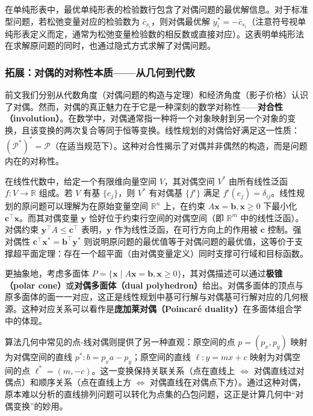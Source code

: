 \documentclass[12pt]{article}
\theoremstyle{plain}
\theoremstyle{definition}
\begin{document}
在单纯形表中，最优单纯形表的检验数行包含了对偶问题的最优解信息。对于标准型问题，若松弛变量对应的检验数为 $\bar{c}_{s_i}$，则对偶最优解 $y_i^* = -\bar{c}_{s_i}$（注意符号视单纯形表定义而定，通常为松弛变量检验数的相反数或直接对应）。这表明单纯形法在求解原问题的同时，也通过隐式方式求解了对偶问题。

\subsubsection{拓展：对偶的对称性本质——从几何到代数}\label{subsubsec:duality_symmetry}

前文我们分别从代数角度（对偶问题的构造与定理）和经济角度（影子价格）认识了对偶。然而，对偶的真正魅力在于它是一种深刻的数学对称性——\textbf{对合性（involution）}。在数学中，对偶通常指一种将一个对象映射到另一个对象的变换，且该变换的两次复合等同于恒等变换。线性规划的对偶恰好满足这一性质：$(\mathcal{P}^*)^* = \mathcal{P}$（在适当规范下）。这种对合性揭示了对偶并非偶然的构造，而是问题内在的对称性。

在线性代数中，给定一个有限维向量空间 $V$，其对偶空间 $V^*$ 由所有线性泛函 $f: V \to \mathbb{R}$ 组成。若 $V$ 有基 $\{e_j\}$，则 $V^*$ 有对偶基 $\{f^i\}$ 满足 $f^i(e_j)=\delta_{ij}$。线性规划的原问题可以理解为在原始变量空间 $\mathbb{R}^n$ 上，在约束 $A\bm{x}=\bm{b}, \bm{x}\ge 0$ 下最小化 $\bm{c}^\top \bm{x}$。而其对偶变量 $\bm{y}$ 恰好位于约束行空间的对偶空间（即 $\mathbb{R}^m$ 中的线性泛函）。对偶约束 $\bm{y}^\top A \le \bm{c}^\top$ 表明，$\bm{y}$ 作为线性泛函，在可行方向上的作用被 $\bm{c}$ 控制。强对偶性 $\bm{c}^\top \bm{x}^* = \bm{b}^\top \bm{y}^*$ 则说明原问题的最优值等于对偶问题的最优值，这等价于支撑超平面定理：存在一个超平面（由对偶变量定义）同时支撑可行域和目标函数。

更抽象地，考虑多面体 $P = \{\bm{x} \mid A\bm{x} = \bm{b}, \bm{x} \ge 0\}$，其对偶描述可以通过\textbf{极锥（polar cone）}或\textbf{对偶多面体（dual polyhedron）}给出。对偶多面体的顶点与原多面体的面一一对应，这正是线性规划中基可行解与对偶基可行解对应的几何根源。这种对应关系可以看作是\textbf{庞加莱对偶（Poincaré duality）}在多面体组合学中的体现。

算法几何中常见的点-线对偶则提供了另一种直观：原空间的点 $p=(p_x, p_y)$ 映射为对偶空间的直线 $p^*: b = p_x a - p_y$；原空间的直线 $\ell: y = mx + c$ 映射为对偶空间的点 $\ell^* = (m, -c)$。这一变换保持关联关系（点在直线上 $\iff$ 对偶直线过对偶点）和顺序关系（点在直线上方 $\iff$ 对偶直线在对偶点下方）。通过这种对偶，原本难以分析的直线排列问题可以转化为点集的凸包问题，这正是计算几何中“对偶变换”的妙用。
\end{document}
